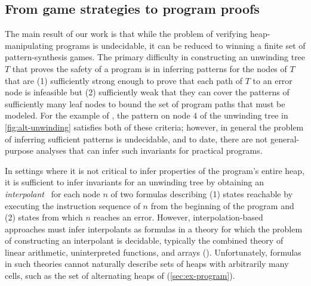 \subsection{From game strategies to program proofs}
\label{sec:ex-infer}
%
The main result of our work is that while the problem of verifying
heap-manipulating programs is undecidable, it can be reduced to
winning a finite set of pattern-synthesis games.
%
The primary difficulty in constructing an unwinding tree $T$ that
proves the safety of a program is in inferring patterns for the nodes
of $T$ that are (1) sufficiently strong enough to prove that each path
of $T$ to an error node is infeasible but (2) sufficiently weak that
they can cover the patterns of sufficiently many leaf nodes to bound
the set of program paths that must be modeled.
%
For the example of \altlist, the pattern on node $4$ of the unwinding
tree in \autoref{fig:alt-unwinding} satisfies both of these criteria;
%
however, in general the problem of inferring sufficient patterns is
undecidable, and to date, there are not general-purpose analyses that
can infer such invariants for practical programs.

In settings where it is not critical to infer properties of the
program's entire heap, it is sufficient to infer invariants for an
unwinding tree by obtaining an \emph{interpolant}~\cite{mcmillan06}
for each node $n$ of two formulas describing (1) states reachable by
executing the instruction sequence of $n$ from the beginning of the
program and (2) states from which $n$ reaches an error.
% 
However, interpolation-based approaches must infer interpolants as
formulas in a theory for which the problem of constructing an
interpolant is decidable, typically the combined theory of linear
arithmetic, uninterpreted functions, and arrays (\liufa).
%
Unfortunately, formulas in such theories cannot naturally describe
sets of heaps with arbitrarily many cells, such as the set of
alternating heaps of \altlist (\autoref{sec:ex-program}).

